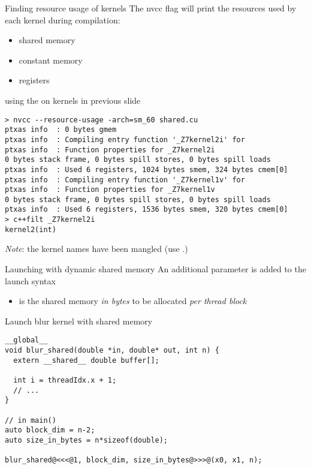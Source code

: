 \documentclass[aspectratio=43]{beamer}
\begin{document}
\begin{frame}[fragile]{Finding resource usage of kernels}
    The nvcc flag  will print the resources used by each kernel during compilation:
    \begin{itemize}
        \item shared memory
        \item constant memory
        \item registers
    \end{itemize}

    \begin{terminal}{using the  on kernels in previous slide}
    \begin{lstlisting}[style=terminal]
> nvcc --resource-usage -arch=sm_60 shared.cu 
ptxas info  : 0 bytes gmem
ptxas info  : Compiling entry function '_Z7kernel2i' for
ptxas info  : Function properties for _Z7kernel2i
0 bytes stack frame, 0 bytes spill stores, 0 bytes spill loads
ptxas info  : Used 6 registers, 1024 bytes smem, 324 bytes cmem[0]
ptxas info  : Compiling entry function '_Z7kernel1v' for
ptxas info  : Function properties for _Z7kernel1v
0 bytes stack frame, 0 bytes spill stores, 0 bytes spill loads
ptxas info  : Used 6 registers, 1536 bytes smem, 320 bytes cmem[0]
> c++filt _Z7kernel2i
kernel2(int)
    \end{lstlisting}
    \end{terminal}
    \emph{Note}: the kernel names have been mangled (use .)

\end{frame}



\begin{frame}[fragile]{Launching with dynamic shared memory}
        An additional parameter is added to the launch syntax
        \\
        \centering {}
        \begin{itemize}
            \item {} is the shared memory \emph{in bytes} to be allocated \emph{per thread block}
        \end{itemize}

    \begin{code}{Launch blur kernel with shared memory}
        \begin{lstlisting}[style=boxcudatiny]
__global__
void blur_shared(double *in, double* out, int n) {
  extern __shared__ double buffer[];

  int i = threadIdx.x + 1;
  // ...
}

// in main()
auto block_dim = n-2;
auto size_in_bytes = n*sizeof(double);

blur_shared@<<<@1, block_dim, size_in_bytes@>>>@(x0, x1, n);
        \end{lstlisting}
    \end{code}

\end{frame}
\end{document}
